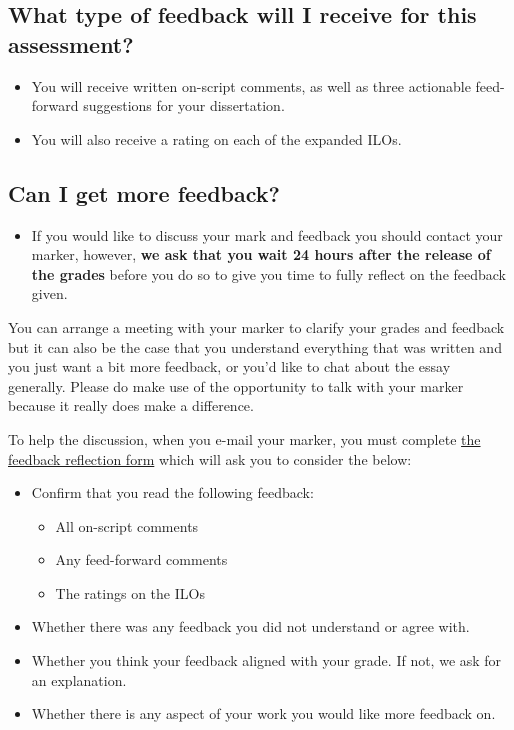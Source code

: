 \documentclass[
  english,
  letterpaper,
  DIV=11,
  numbers=noendperiod]{scrreprt}
\providecommand{\tightlist}{%
  \setlength{\itemsep}{0pt}\setlength{\parskip}{0pt}}
\begin{document}
\subsection{What type of feedback will I receive for this
assessment?}\label{what-type-of-feedback-will-i-receive-for-this-assessment-2}

\begin{itemize}
\item
  You will receive written on-script comments, as well as three
  actionable feed-forward suggestions for your dissertation.
\item
  You will also receive a rating on each of the expanded ILOs.
\end{itemize}

\subsection{Can I get more feedback?}\label{can-i-get-more-feedback-2}

\begin{itemize}
\tightlist
\item
  If you would like to discuss your mark and feedback you should contact
  your marker, however, \textbf{we ask that you wait 24 hours after the
  release of the grades} before you do so to give you time to fully
  reflect on the feedback given.
\end{itemize}

You can arrange a meeting with your marker to clarify your grades and
feedback but it can also be the case that you understand everything that
was written and you just want a bit more feedback, or you'd like to chat
about the essay generally. Please do make use of the opportunity to talk
with your marker because it really does make a difference.

To help the discussion, when you e-mail your marker, you must complete
\href{https://gla-my.sharepoint.com/:w:/g/personal/ashley_robertson_glasgow_ac_uk/EanCqf_RV7pMumQt1Bm0N4YB3RlzoIjP9kmbe0qbYj9rYQ?e=MDWxPP}{the
feedback reflection form} which will ask you to consider the below:

\begin{itemize}
\tightlist
\item
  Confirm that you read the following feedback:

  \begin{itemize}
  \tightlist
  \item
    All on-script comments
  \item
    Any feed-forward comments
  \item
    The ratings on the ILOs
  \end{itemize}
\item
  Whether there was any feedback you did not understand or agree with.
\item
  Whether you think your feedback aligned with your grade. If not, we
  ask for an explanation.
\item
  Whether there is any aspect of your work you would like more feedback
  on.
\end{itemize}
\end{document}
